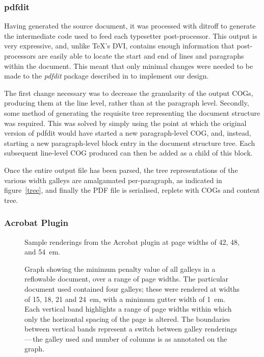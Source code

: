 \documentclass{sig-alternate}
\begin{document}

\subsubsection{pdfdit}
Having generated the source document, it was processed with ditroff to generate the intermediate code used to feed each typesetter post-pro\-cessor. This output is very expressive, and, unlike \TeX's DVI, contains enough information that post-processors are easily able to locate the start and end of lines and paragraphs within the document. This meant that only minimal changes were needed to be made to the \emph{pdfdit} package described in \cite{Bagley2003} to implement our design.

The first change necessary was to decrease the granularity of the output COGs, producing them at the line level, rather than at the paragraph level. Secondly, some method of generating the requisite tree representing the document structure was required. This was solved by simply using the point at which the original version of pdfdit would have started a new paragraph-level COG, and, instead, starting a new paragraph-level block entry in the document structure tree. Each subsequent line-level COG produced can then be added as a child of this block.

Once the entire output file has been parsed, the tree representations of the various width galleys are amalgamated per-paragraph, as indicated in figure~\ref{tree}, and finally the PDF file is serialised, replete with COGs and content tree.






\subsubsection{Acrobat Plugin}
\begin{figure}
 \centering
 \vspace{-6pt}
 \caption{Sample renderings from the Acrobat plugin at page widths of 42, 48, and 54~em.}\vspace{-3pt}
\end{figure}

\begin{figure*}
	\centering
	\vspace{-6pt}
	\caption{Graph showing the minimum penalty value of all galleys in a reflowable document, over a range of page widths. The particular document used contained four galleys; these were rendered at widths of 15, 18, 21 and 24~em, with a minimum gutter width of 1~em. Each vertical band highlights a range of page widths within which only the horizontal spacing of the page is altered. The boundaries between vertical bands represent a switch between galley renderings\,---\,the galley used and number of columns is as annotated on the graph.}\vspace{-3pt}
	\label{graph}
\end{figure*}
\end{document}
